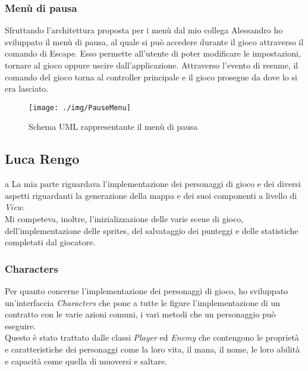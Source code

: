 \subsubsection*{Menù di pausa}
Sfruttando l'architettura proposta per i menù dal mio collega Alessandro ho sviluppato il menù di pausa, al quale si può accedere durante il gioco attraverso il comando di Escape.
Esso permette all'utente di poter modificare le impostazioni, tornare al gioco oppure uscire dall'applicazione.
Attraverso l'evento di resume, il comando del gioco torna al controller principale e il gioco prosegue da dove lo si era lasciato.

\begin{figure}[H]
	\centering{}
	\texttt{[image: ./img/PauseMenu]}
	\label{img:PauseMenu.png}
	\caption{Schema UML rappresentante il menù di pausa}
\end{figure}



\newpage

\subsection*{Luca Rengo}
a
\textsf{\small La mia parte riguardava l'implementazione dei personaggi di gioco e dei diversi aspetti riguardanti la generazione della mappa e dei suoi componenti a livello di \emph{View}.}\\

\textsf{\small Mi competeva, inoltre, l'inizializzazione delle varie scene di gioco, dell'implementazione delle sprites, del salvataggio dei punteggi e delle statistiche completati dal giocatore.}\\ 

\subsubsection*{Characters}

\textsf{\small Per quanto concerne l'implementazione dei personaggi di gioco, ho sviluppato un'interfaccia \emph{Characters} che pone a tutte le figure l'implementazione di un contratto con le varie azioni comuni, i vari metodi che un personaggio può eseguire.}\\

\textsf{\small Questo è stato trattato dalle classi \emph{Player} ed \emph{Enemy} che contengono le proprietà e caratteristiche dei personaggi come la loro vita, il mana, il nome, le loro abilità e capacità come quella di muoversi e saltare.}\\


